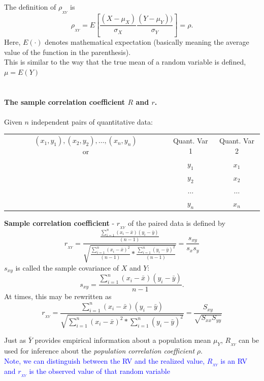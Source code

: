 The definition of $\rho_{_{XY}}$ is
$$\rho_{_{XY}} = E\left[\frac{(X-\mu_X)}{\sigma_X}\frac{(Y-\mu_Y))}{\sigma_Y}\right]=\rho.$$
Here, $E(\cdot)$ denotes mathematical expectation (basically meaning the average value of the function in the parenthesis).\\

This is similar to the way that the true mean of a random variable is defined, $\mu=E(Y)$ \\~\\~\\

\Large \textbf{The sample correlation coefficient $R$ and $r$.} \large\\~\\
Given $n$ independent pairs of quantitative data:
\begin{center}
\begin{tabular}{cc|c}
$ (x_1,y_1), (x_2,y_2), \ldots, (x_n,y_n) $ ~~~~~~~or~~~~~~~& Quant. Var 1 &	Quant. Var 2\\\cline{2-3}
&$y_1$	&$x_1$\\
&$y_2$	&$x_2$ \\
&$\ldots$&$\ldots$\\
&$y_n$ &$x_n$
\end{tabular}
\end{center}

\textbf{Sample correlation coefficient} - $r_{_{XY}}$ of the paired data is defined by 
$$ r_{_{XY}} = 
\frac{\frac{\sum_{i=1}^{n}(x_i - \bar{x})(y_i - \bar{y})}{(n-1)}}{\sqrt{\frac{\sum_{i=1}^{n}(x_i - \bar{x})^2}{(n-1)}*\frac{\sum_{i=1}^{n}(y_i -\bar{y})^2}{(n-1)}}} = \frac{s_{xy}}{s_x s_y}$$
$s_{xy}$ is called the sample covariance of $X$ and $Y$:
$$s_{xy}=\frac{\sum_{i=1}^{n}(x_i-\bar{x})(y_i-\bar{y})}{n-1}.$$
At times, this may be rewritten as 
$$ r_{_{XY}} = \frac{\sum_{i=1}^{n}(x_i - \bar{x})(y_i - \bar{y})}{\sqrt{\sum_{i=1}^{n}(x_i - \bar{x})^2*\sum_{i=1}^{n}(y_i -\bar{y})^2}}=\frac{S_{xy}}{\sqrt{S_{xx}S_{yy}}}$$

\newpage

Just as $\bar{Y}$ provides empirical information about a population mean $\mu_Y$, $R_{_{XY}}$ can be used for inference about the {\em population correlation coefficient} 
$\rho$.\\

\textcolor{blue}{Note, we can distinguish between the RV and the realized value, $R_{_{XY}}$ is an RV and $r_{_{XY}}$ is the observed value of that random variable}\\
	
